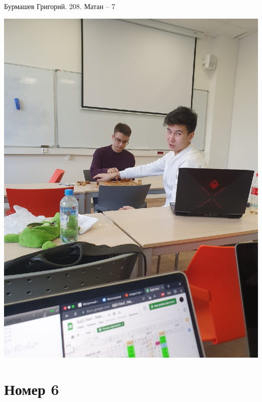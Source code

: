 \documentclass[a4paper,12pt]{article}
\author{Бурмашев Григорий, БПМИ-208}
\title{}
\date{\today}
\begin{document}
\begin{center}
Бурмашев Григорий. 208. Матан -- 7 
\end{center}
 \begin{center}
\includegraphics[scale=0.34]{1.jpg}
\end{center}
\clearpage
\section*{Номер 6}
\end{document}

